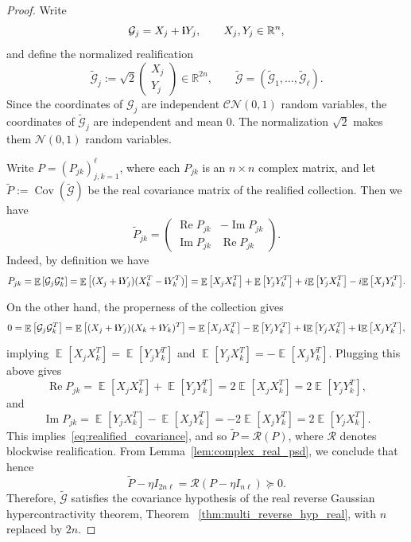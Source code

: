 \documentclass[11pt]{article}
\newcommand\Expect[2]{{\mathop{\mathbb{E}}_{#1}\left[ {#2} \right]}}
\begin{document}
{\MGRH*}

\begin{proof}
Write
\[
\mathcal{G}_j=X_j+{\bf i}Y_j,
\qquad X_j,Y_j\in\mathbb{R}^n,
\]
and define the normalized realification
\[
\widetilde{\mathcal{G}}_j
:=
\sqrt{2}
\begin{pmatrix}
X_j\\
Y_j
\end{pmatrix}
\in\mathbb{R}^{2n},
\qquad
\widetilde{\mathcal{G}}
=
(\widetilde{\mathcal{G}}_1,\ldots,
 \widetilde{\mathcal{G}}_\ell).
\]
Since the coordinates of $\mathcal{G}_j$ are independent
$\mathcal{CN}(0,1)$ random variables, the coordinates of
$\widetilde{\mathcal{G}}_j$ are independent and mean $0$. The normalization $\sqrt{2}$ makes them $\mathcal{N}(0,1)$ random variables.

Write \(P=(P_{jk})_{j,k=1}^{\ell}\), where each \(P_{jk}\) is an
\(n\times n\) complex matrix, and let $\widetilde{P} :=\operatorname{Cov}(\widetilde{\mathcal{G}})
$
be the real covariance matrix of the realified collection. Then we have
\begin{equation}\label{eq:realified_covariance}
\widetilde P_{jk}
=
\begin{pmatrix}
\operatorname{Re}P_{jk} & -\operatorname{Im}P_{jk}\\
\operatorname{Im}P_{jk} &  \operatorname{Re}P_{jk}
\end{pmatrix}.
\end{equation}
Indeed, by definition we have 
\[
P_{jk}=\Expect{}{\mathcal{G}_j\mathcal{G}_k^*} = \Expect{}{(X_j+{\bf i} Y_j)(X_k^T-{\bf i}Y_k^T)} = \Expect{}{X_jX_k^T} + \Expect{}{Y_jY_k^T} + i \Expect{}{Y_jX_k^T} - i \Expect{}{X_jY_k^T}.
\]
On the other hand, the properness of the collection gives
%
\[
0=\Expect{}{\mathcal{G}_j\mathcal{G}_k^T} = \Expect{}{(X_j+{\bf i} Y_j)(X_k+{\bf i}Y_k)^T} = \Expect{}{X_jX_k^T} - \Expect{}{Y_jY_k^T} + {\bf i} \Expect{}{Y_jX_k^T} + {\bf i} \Expect{}{X_jY_k^T},
\]
implying $\Expect{}{X_jX_k^T} = \Expect{}{Y_jY_k^T}$ and $\Expect{}{Y_jX_k^T} =- \Expect{}{X_jY_k^T}$. Plugging this above gives
\[
\operatorname{Re}P_{jk} = \Expect{}{X_jX_k^T} + \Expect{}{Y_jY_k^T} = 2\Expect{}{X_jX_k^T} = 2\Expect{}{Y_jY_k^T},
\]
and
\[
\operatorname{Im}P_{jk}  =  \Expect{}{Y_jX_k^T} -  \Expect{}{X_jY_k^T} = -2  \Expect{}{X_jY_k^T} = 2\Expect{}{Y_jX_k^T}.
\]
This implies~\eqref{eq:realified_covariance}, and so $\widetilde P=\mathcal{R}(P)$, where $\mathcal{R}$ denotes
blockwise realification. From Lemma~\ref{lem:complex_real_psd}, we conclude that hence
\[
\widetilde P-\eta I_{2n\ell}
=
\mathcal{R}\left(P-\eta I_{n\ell}\right)
\succeq 0.
\]
Therefore, $\widetilde{\mathcal{G}}$ satisfies the covariance
hypothesis of the real reverse Gaussian hypercontractivity theorem, Theorem ~\ref{thm:multi_reverse_hyp_real}, with $n$ replaced by $2n$.


\end{proof}
\end{document}
